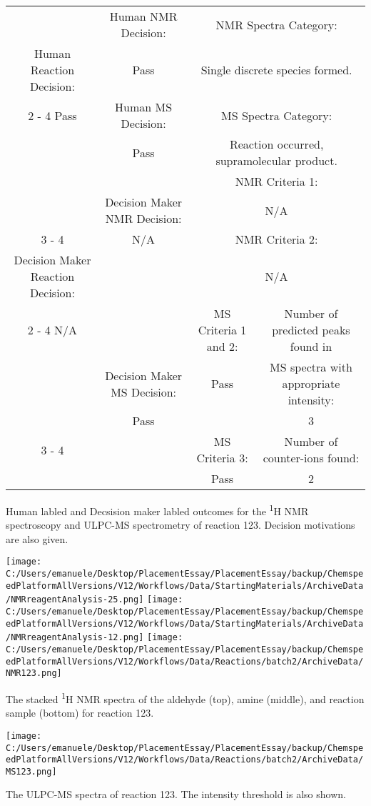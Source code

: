 \documentclass{article}%
\begin{document}
\begin{Decision Table}[H]%
\begin{tabular}{|c|c|c|c|}%
\hline%
&Human NMR Decision:&\multicolumn{2}{|c|}{NMR Spectra Category:}\\%
Human Reaction Decision:&Pass&\multicolumn{2}{|c|}{Single discrete species formed.}\\%
\cline{2%
-%
4}%
Pass&Human MS Decision:&\multicolumn{2}{|c|}{MS Spectra Category:}\\%
&Pass&\multicolumn{2}{|c|}{Reaction occurred, supramolecular product.}\\%
\hline%
&&\multicolumn{2}{|c|}{NMR Criteria 1:}\\%
&Decision Maker NMR Decision:&\multicolumn{2}{|c|}{N/A}\\%
\cline{3%
-%
4}%
&N/A&\multicolumn{2}{|c|}{NMR Criteria 2:}\\%
Decision Maker Reaction Decision:&&\multicolumn{2}{|c|}{N/A}\\%
\cline{2%
-%
4}%
N/A&&MS Criteria 1 and 2:&Number of predicted peaks found in\\%
&Decision Maker MS Decision:&Pass&MS spectra with appropriate intensity:\\%
&Pass&&3\\%
\cline{3%
-%
4}%
&&MS Criteria 3:&Number of counter{-}ions found:\\%
&&Pass&2\\%
\hline%
\end{tabular}%
\caption{Human labled and Decsision maker labled outcomes for the \textsuperscript{1}H NMR spectroscopy and ULPC-MS spectrometry of reaction 123. Decision motivations are also given.}%
\end{Decision Table}%
\begin{NMR Spectra}[H]%
\begin{center}%
\texttt{[image: C:/Users/emanuele/Desktop/PlacementEssay/PlacementEssay/backup/ChemspeedPlatformAllVersions/V12/Workflows/Data/StartingMaterials/ArchiveData/NMRreagentAnalysis-25.png]}\hfill%
\texttt{[image: C:/Users/emanuele/Desktop/PlacementEssay/PlacementEssay/backup/ChemspeedPlatformAllVersions/V12/Workflows/Data/StartingMaterials/ArchiveData/NMRreagentAnalysis-12.png]}\hfill%
\texttt{[image: C:/Users/emanuele/Desktop/PlacementEssay/PlacementEssay/backup/ChemspeedPlatformAllVersions/V12/Workflows/Data/Reactions/batch2/ArchiveData/NMR123.png]}\hfill%
\end{center}%
\caption{The stacked \textsuperscript{1}H NMR spectra of the aldehyde (top), amine (middle), and reaction sample (bottom) for reaction 123.}%
\end{NMR Spectra}%
\begin{MS Spectra}[H]%
\begin{center}%
\texttt{[image: C:/Users/emanuele/Desktop/PlacementEssay/PlacementEssay/backup/ChemspeedPlatformAllVersions/V12/Workflows/Data/Reactions/batch2/ArchiveData/MS123.png]}\hfill%
\end{center}%
\caption{The ULPC-MS spectra of reaction 123. The intensity threshold is also shown.}%
\end{MS Spectra}%
\end{document}
